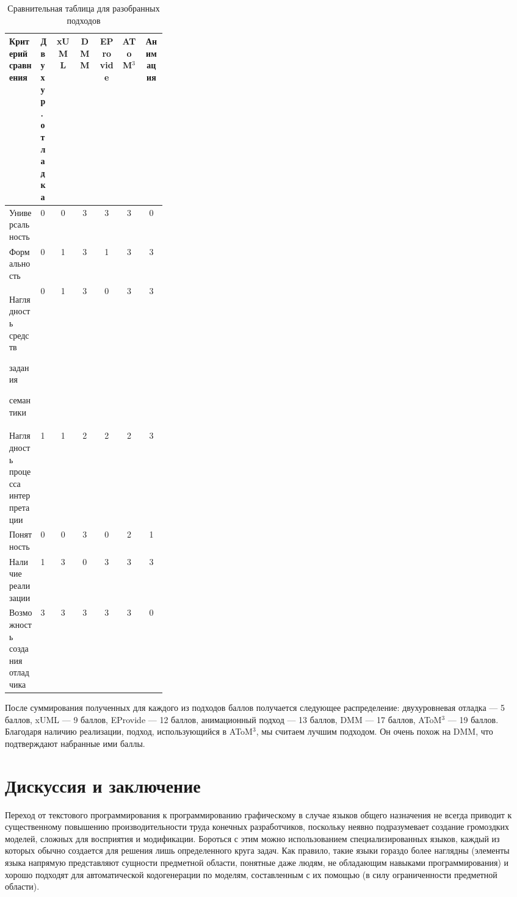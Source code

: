 \documentclass[a5paper]{article}
\begin{document}
\begin{table}[h]
\begin{center}
\begin{tabular}{| p{0.2\linewidth} | p{0.1\linewidth} | c|c|c|c|c|}
  \hline
  Критерий сравнения                              & Двухур. отладка & xUML & DMM & EProvide & AToM$^3$ & Ани\-ма\-ция \\   \hline  
  Универ\-саль\-ность                             & 0               & 0    & 3   & 3        & 3     & 0        \\   \hline  
  Фор\-маль\-ность                                & 0               & 1    & 3   & 1        & 3     & 3        \\   \hline  
  Наглядность средств \par задания \par семантики & 0               & 1    & 3   & 0        & 3     & 3        \\   \hline  
  Наглядность процесса интерпретации              & 1               & 1    & 2   & 2        & 2     & 3        \\   \hline  
  Понятность                                      & 0               & 0    & 3   & 0        & 2     & 1        \\   \hline  
  Наличие реализации                              & 1               & 3    & 0   & 3        & 3     & 3        \\   \hline  
  Возможность создания отладчика                  & 3               & 3    & 3   & 3        & 3     & 0        \\   \hline  
\end{tabular}
\end{center}
\caption{ Сравнительная таблица для разобранных подходов}
\label{table1}
\end{table}


После суммирования полученных для каждого из подходов баллов получается следующее распределение: двухуровневая отладка --- 5 баллов, xUML --- 9 баллов, EProvide --- 12 баллов, анимационный подход --- 13 баллов, DMM --- 17 баллов, AToM$^3$ --- 19 баллов. Благодаря наличию реализации, подход, использующийся в AToM$^3$, мы считаем лучшим подходом. Он очень похож на DMM, что подтверждают набранные ими баллы.

\section{Дискуссия и заключение}

Переход от текстового программирования к программированию графическому в случае языков общего назначения не всегда приводит к существенному повышению производительности труда конечных разработчиков, поскольку неявно подразумевает создание громоздких моделей, сложных для восприятия и модификации. Бороться с этим можно использованием специализированных языков, каждый из которых обычно создается для решения лишь определенного круга задач. Как правило, такие языки гораздо более наглядны (элементы языка напрямую представляют сущности предметной области, понятные даже людям, не обладающим навыками программирования) и хорошо подходят для автоматической кодогенерации по моделям, составленным с их помощью (в силу ограниченности предметной области). 
\end{document}
